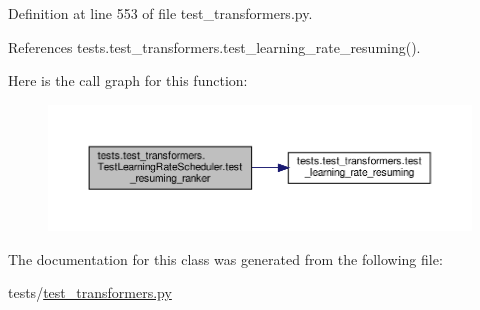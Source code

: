 Definition at line 553 of file test\+\_\+transformers.\+py.



References tests.\+test\+\_\+transformers.\+test\+\_\+learning\+\_\+rate\+\_\+resuming().

Here is the call graph for this function\+:
\nopagebreak
\begin{figure}[H]
\begin{center}
\leavevmode
\includegraphics[width=350pt]{classtests_1_1test__transformers_1_1TestLearningRateScheduler_a1f6f7d394258d2170c3005e6dffae8a7_cgraph}
\end{center}
\end{figure}


The documentation for this class was generated from the following file\+:\begin{DoxyCompactItemize}
\item 
tests/\hyperlink{test__transformers_8py}{test\+\_\+transformers.\+py}\end{DoxyCompactItemize}
